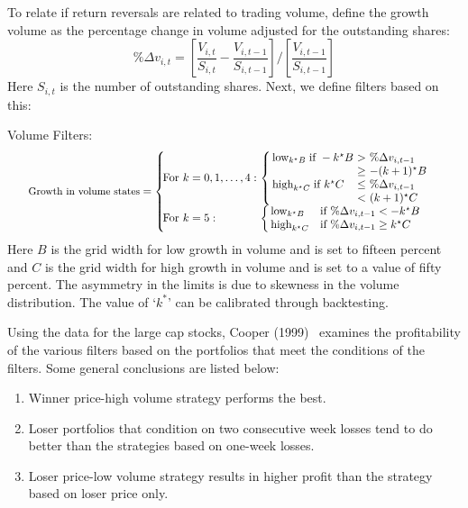 To relate if return reversals are related to trading volume, define the growth volume as the percentage change in volume adjusted for the outstanding shares: 
	\begin{equation}\label{eqn:perdeltav}
	\%\Delta v_{i,t} = \left[\frac{V_{i,t}}{S_{i,t}}-\frac{V_{i,t-1}}{S_{i,t-1}}\right] / \left[\frac{V_{i,t-1}}{S_{i,t-1}}\right]
	\end{equation}
Here $S_{i,t}$ is the number of outstanding shares. Next, we define filters based on this: \twomedskip


\noindent Volume Filters: 
	\begin{equation} \label{eqn:volfilter}
	\scalebox{0.89}{$\textrm{\small Growth in volume states} = \left\{ 
	\begin{array}{lllll}
		\!\!\!\!\textrm{For} ~k = 0,1,\ldots,4: & \!\!\!\!\left\{ 
			\begin{array}{lllll}
			\!\!\!\! \textrm{  low}_{k^\star B}\;  \textrm{if } -k^\star B &\!\!\!\!>\!\!\!\! & \!\!\!\! \%\Delta v_{i,t-1} \\
			\!\!\!\!& \!\!\!\!\geq & \!\!\!\!- (k+1)^\star B \\
	\!\!\!\! \textrm{ high}_{k^\star C}\; \textrm{if } k^\star C & \!\!\!\!\leq&\!\!\!\! \%\Delta v_{i,t-1} \\
	&\!\!\!\!<&\!\!\!\!  (k+1)^\star C
			\end{array}
		\right.\\
		\!\!\!\!\textrm{For} ~k = 5: & \!\!\!\!\left\{
		 \begin{array}{ll}
		 \!\!\!\! \textrm{ low}_{k^\star B} & \textrm{if} ~\%\Delta v_{i,t-1} <-k^\star B \\
		 \!\!\!\! \textrm{ high}_{k^\star C} & \textrm{if}  ~\%\Delta v_{i,t-1} \geq  k^\star C
		 	\end{array} \right.
		\end{array} \right. $}
	\end{equation} 
Here $B$ is the grid width for low growth in volume and is set to fifteen percent and $C$ is the grid width for high growth in volume and is set to a value of fifty percent. The asymmetry in the limits is due to skewness in the volume distribution. The value of `$k^*$' can be calibrated through backtesting. 


Using the data for the large cap stocks, Cooper (1999)~\cite{cooper} examines the profitability of the various filters based on the portfolios that meet the conditions of the filters. Some general conclusions are listed below:
	\begin{enumerate}[--]
	\item Winner price-high volume strategy performs the best.
	\item Loser portfolios that condition on two consecutive week losses tend to do better than the strategies based on one-week losses.
	\item Loser price-low volume strategy results in higher profit than the strategy based on loser price only.
	\end{enumerate}


